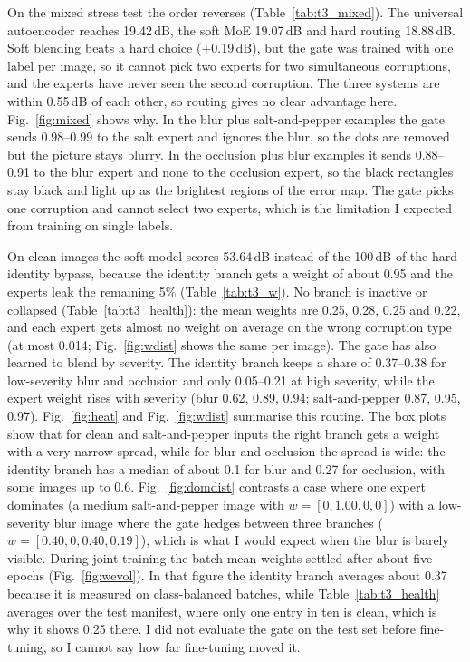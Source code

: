 \documentclass[conference]{IEEEtran}
\begin{document}
On the mixed stress test the order reverses (Table~\ref{tab:t3_mixed}). The universal autoencoder reaches 19.42\,dB, the soft MoE 19.07\,dB and hard routing 18.88\,dB. Soft blending beats a hard choice (+0.19\,dB), but the gate was trained with one label per image, so it cannot pick two experts for two simultaneous corruptions, and the experts have never seen the second corruption. The three systems are within 0.55\,dB of each other, so routing gives no clear advantage here. Fig.~\ref{fig:mixed} shows why. In the blur plus salt-and-pepper examples the gate sends 0.98--0.99 to the salt expert and ignores the blur, so the dots are removed but the picture stays blurry. In the occlusion plus blur examples it sends 0.88--0.91 to the blur expert and none to the occlusion expert, so the black rectangles stay black and light up as the brightest regions of the error map. The gate picks one corruption and cannot select two experts, which is the limitation I expected from training on single labels.

On clean images the soft model scores 53.64\,dB instead of the 100\,dB of the hard identity bypass, because the identity branch gets a weight of about 0.95 and the experts leak the remaining 5\% (Table~\ref{tab:t3_w}). No branch is inactive or collapsed (Table~\ref{tab:t3_health}): the mean weights are 0.25, 0.28, 0.25 and 0.22, and each expert gets almost no weight on average on the wrong corruption type (at most 0.014; Fig.~\ref{fig:wdist} shows the same per image). The gate has also learned to blend by severity. The identity branch keeps a share of 0.37--0.38 for low-severity blur and occlusion and only 0.05--0.21 at high severity, while the expert weight rises with severity (blur 0.62, 0.89, 0.94; salt-and-pepper 0.87, 0.95, 0.97). Fig.~\ref{fig:heat} and Fig.~\ref{fig:wdist} summarise this routing. The box plots show that for clean and salt-and-pepper inputs the right branch gets a weight with a very narrow spread, while for blur and occlusion the spread is wide: the identity branch has a median of about 0.1 for blur and 0.27 for occlusion, with some images up to 0.6. Fig.~\ref{fig:domdist} contrasts a case where one expert dominates (a medium salt-and-pepper image with $w=[0,1.00,0,0]$) with a low-severity blur image where the gate hedges between three branches ($w=[0.40,0,0.40,0.19]$), which is what I would expect when the blur is barely visible. During joint training the batch-mean weights settled after about five epochs (Fig.~\ref{fig:wevol}). In that figure the identity branch averages about 0.37 because it is measured on class-balanced batches, while Table~\ref{tab:t3_health} averages over the test manifest, where only one entry in ten is clean, which is why it shows 0.25 there. I did not evaluate the gate on the test set before fine-tuning, so I cannot say how far fine-tuning moved it.
\end{document}
